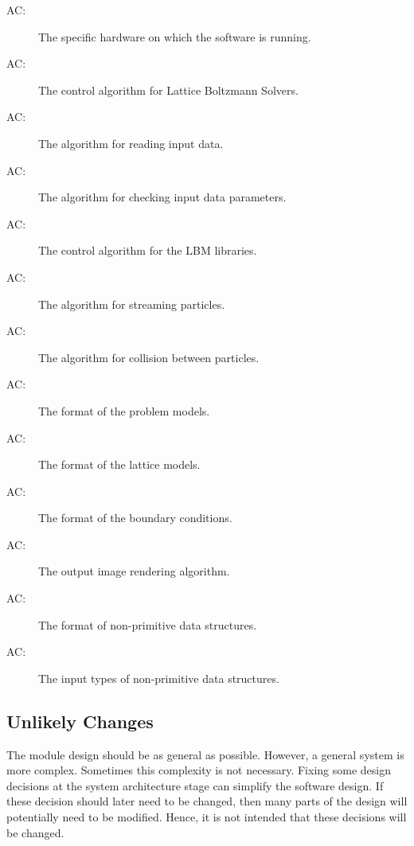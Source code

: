 \documentclass[12pt, titlepage]{article}
\newcounter{acnum}
\newcommand{\actheacnum}{AC\theacnum}
\newcommand{\famname}{Lattice Boltzmann Solvers} %
\begin{document}
\begin{description}
\item[ \actheacnum \label{acHardware}:] The specific
  hardware on which the software is running.
\item[ \actheacnum \label{acCA}:] The control algorithm  for \famname.  
\item[ \actheacnum \label{acInput}:] The algorithm for reading input data.
\item[ \actheacnum \label{acInputParameters}:] The algorithm for checking input data parameters.
\item[ \actheacnum \label{acLBM}:] The control algorithm for the LBM libraries.  
\item[ \actheacnum \label{acStreaming}:] The algorithm for streaming particles. 
\item[ \actheacnum \label{acCollision}:] The algorithm for collision between particles. 
\item[ \actheacnum \label{acProblemFormat}:] The format of the problem models.
\item[ \actheacnum \label{acModels}:] The format of the lattice models.
\item[ \actheacnum \label{acBoundary}:] The format of the boundary conditions.
\item[ \actheacnum \label{acOutput}:] The output image rendering algorithm. 
\item[ \actheacnum \label{acDS}:] The format of non-primitive data structures. 
\item[ \actheacnum \label{acIT}:] The input types of non-primitive data structures. 
\end{description}

\subsection{Unlikely Changes} \label{SecUchange}

The module design should be as general as possible. However, a general system is
more complex. Sometimes this complexity is not necessary. Fixing some design
decisions at the system architecture stage can simplify the software design. If
these decision should later need to be changed, then many parts of the design
will potentially need to be modified. Hence, it is not intended that these
decisions will be changed.
\end{document}
